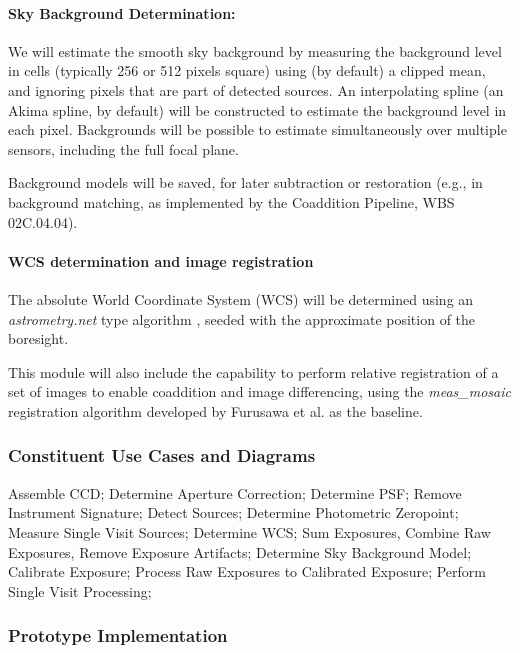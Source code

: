 \documentclass[12pt]{article}
\newcommand{\wbsCoadd}{WBS 02C.04.04}
\begin{document}
\paragraph{Sky Background Determination:}

We will estimate the smooth sky background by measuring the background level in cells (typically 256 or 512 pixels square) %
using (by default) a clipped mean, and ignoring pixels that are part of detected sources.  An interpolating spline (an Akima spline, by default) will be constructed to estimate the background level in each pixel. Backgrounds will be possible to estimate simultaneously over multiple sensors, including the full focal plane.

Background models will be saved, for later subtraction or restoration (e.g., in background matching, as implemented by the Coaddition Pipeline, \wbsCoadd).

\paragraph{WCS determination and image registration}

The absolute World Coordinate System (WCS) will be determined using an \emph{astrometry.net} type algorithm \cite{Lang09}, seeded with the approximate position of the boresight.  %

This module will also include the capability to perform relative registration of a set of images to enable coaddition and image differencing, using the \emph{meas\_mosaic} registration algorithm developed by Furusawa et al. \cite{Furusawa14} as the baseline.

\subsubsection{Constituent Use Cases and Diagrams}

Assemble CCD; Determine Aperture Correction; Determine PSF; Remove Instrument Signature; Detect Sources; Determine Photometric Zeropoint; Measure Single Visit Sources; Determine WCS; Sum Exposures, Combine Raw Exposures, Remove Exposure Artifacts; Determine Sky Background Model; Calibrate Exposure; Process Raw Exposures to Calibrated Exposure; Perform Single Visit Processing;

\subsubsection{Prototype Implementation}
\end{document}
